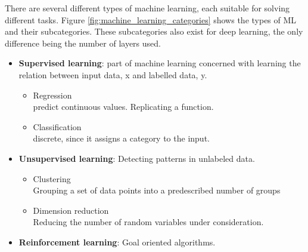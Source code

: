 There are several different types of machine learning, each suitable for solving different tasks. Figure \ref{fig:machine_learning_categories} shows the types of ML and their subcategories. These subcategories also exist for deep learning, the only difference being the number of layers used.

 

\begin{itemize}
    \item \textbf{Supervised learning}: part of machine learning concerned with learning the relation between input data, x and labelled data, y.
    \begin{itemize}
        \item Regression\\predict continuous values. Replicating a function.
        \item Classification\\discrete, since it assigns a category to the input.
    \end{itemize}
    \item \textbf{Unsupervised learning}: Detecting patterns in unlabeled data.
    \begin{itemize}
        \item Clustering\\Grouping a set of data points into a predescribed number of groups
        \item Dimension reduction\\Reducing the number of random variables under consideration.
    \end{itemize}
    \item \textbf{Reinforcement learning}: Goal oriented algorithms.
\end{itemize}

